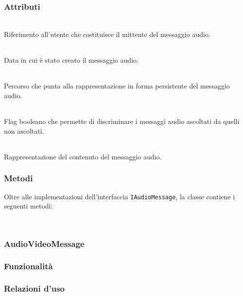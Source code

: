 \subsubsection*{Attributi}
\begin{description}
  \item{}\\
Riferimento all'utente che costituisce il mittente del messaggio audio.
  \item{}\\
Data in cui è stato creato il messaggio audio.
  \item{}\\
Percorso che punta alla rappresentazione in forma persistente del messaggio audio.
  \item{}\\
Flag booleano che permette di discriminare i messaggi audio ascoltati da quelli non ascoltati.
  \item{}\\
Rappresentazione del contenuto del messaggio audio.
\end{description}

\subsubsection*{Metodi}
Oltre alle implementazioni dell'interfaccia \texttt{IAudioMessage}, la classe contiene i seguenti metodi:
\begin{description}
  \item{}\\
\end{description}

\subsubsection{AudioVideoMessage}\label{sec:audiovideomessage}

\subsubsection*{Funzionalità}

\subsubsection*{Relazioni d'uso}

